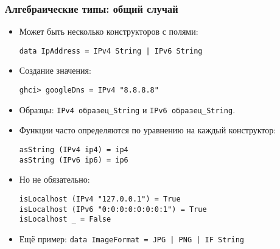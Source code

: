 \documentclass[10pt]{beamer}
\begin{document}
\begin{frame}[fragile]
\frametitle{Алгебраические типы: общий случай}
\begin{itemize}
    \item Может быть несколько конструкторов с полями:
\begin{lstlisting}[basicstyle=\ttfamily\small]
data IpAddress = IPv4 String | IPv6 String
\end{lstlisting}
\item Создание значения:
\begin{lstlisting}[basicstyle=\ttfamily\small]
ghci> googleDns = IPv4 "8.8.8.8"
\end{lstlisting}
\item Образцы: \lstinline[basicstyle=\ttfamily\small]|IPv4 образец_String| и \lstinline[basicstyle=\ttfamily\small]|IPv6 образец_String|.
\item Функции часто определяются по уравнению на каждый конструктор:
\begin{lstlisting}[basicstyle=\ttfamily\small]
asString (IPv4 ip4) = ip4
asString (IPv6 ip6) = ip6
\end{lstlisting}
\pause
\item Но не обязательно:
\begin{lstlisting}[basicstyle=\ttfamily\small]
isLocalhost (IPv4 "127.0.0.1") = True
isLocalhost (IPv6 "0:0:0:0:0:0:0:1") = True
isLocalhost _ = False
\end{lstlisting}
\pause
\item Ещё пример: \lstinline[basicstyle=\ttfamily\small]!data ImageFormat = JPG | PNG | IF String!
\end{itemize}
\end{frame}
\end{document}
